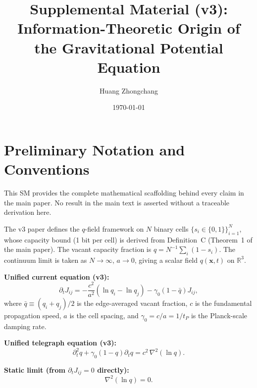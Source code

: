 \documentclass[reprint]{revtex4-2}
\begin{document}
\title{Supplemental Material (v3):\\
Information-Theoretic Origin of the Gravitational Potential Equation}

\author{Huang Zhongchang}

\date{\today}

\maketitle
\tableofcontents

\section{Preliminary Notation and Conventions}

This SM provides the complete mathematical scaffolding behind every claim in the main paper. No result in the main text is asserted without a traceable derivation here.

The v3 paper defines the $q$-field framework on $N$ binary cells $\{s_i\in\{0,1\}\}_{i=1}^N$, whose capacity bound (1 bit per cell) is derived from Definition~C (Theorem~1 of the main paper). The vacant capacity fraction is $q=N^{-1}\sum_i(1-s_i)$. The continuum limit is taken as $N\to\infty$, $a\to0$, giving a scalar field $q(\mathbf{x},t)$ on $\mathbb{R}^3$.

\textbf{Unified current equation (v3):}
\begin{equation}
\partial_t J_{ij} = -\frac{c^2}{a^2}(\ln q_i - \ln q_j) - \gamma_0(1-\bar{q})J_{ij},
\label{eq:unified_current}
\end{equation}
where $\bar{q} \equiv (q_i+q_j)/2$ is the edge-averaged vacant fraction, $c$ is the fundamental propagation speed, $a$ is the cell spacing, and $\gamma_0 = c/a = 1/t_P$ is the Planck-scale damping rate.

\textbf{Unified telegraph equation (v3):}
\begin{equation}
\boxed{\partial_t^2 q + \gamma_0(1-q)\partial_t q = c^2\,\nabla^2(\ln q)}.
\label{eq:unified_telegraph}
\end{equation}

\textbf{Static limit (from $\partial_t J_{ij}=0$ directly):}
\begin{equation}
\boxed{\nabla^2(\ln q) = 0}.
\label{eq:static_limit}
\end{equation}
\end{document}

